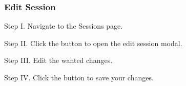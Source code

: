 \subsubsection{Edit Session}

\begin{userManualItemlist}
	\item[Step I.] Navigate to the Sessions page.
	\item[Step II.] Click the button to open the edit session modal.
	\item[Step III.] Edit the wanted changes.
	\item[Step IV.] Click the button to save your changes.
\end{userManualItemlist}